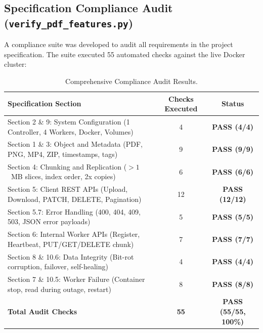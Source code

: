 \documentclass[11pt,a4paper]{article}
\begin{document}
\subsection{Specification Compliance Audit (\texttt{verify\_pdf\_features.py})}
A compliance suite was developed to audit all requirements in the project specification. The suite executed 55 automated checks against the live Docker cluster:
\begin{table}[H]
\centering
\small
\begin{tabular}{@{}lcc@{}}
\toprule
\textbf{Specification Section} & \textbf{Checks Executed} & \textbf{Status} \\ \midrule
Section 2 \& 9: System Configuration (1 Controller, 4 Workers, Docker, Volumes) & 4 & \textbf{PASS (4/4)} \\
Section 1 \& 3: Object and Metadata (PDF, PNG, MP4, ZIP, timestamps, tags)      & 9 & \textbf{PASS (9/9)} \\
Section 4: Chunking and Replication ($>1$~MB slices, index order, 2x copies)    & 6 & \textbf{PASS (6/6)} \\
Section 5: Client REST APIs (Upload, Download, PATCH, DELETE, Pagination)       & 12 & \textbf{PASS (12/12)} \\
Section 5.7: Error Handling (400, 404, 409, 503, JSON error payloads)           & 5 & \textbf{PASS (5/5)} \\
Section 6: Internal Worker APIs (Register, Heartbeat, PUT/GET/DELETE chunk)     & 7 & \textbf{PASS (7/7)} \\
Section 8 \& 10.6: Data Integrity (Bit-rot corruption, failover, self-healing)  & 4 & \textbf{PASS (4/4)} \\
Section 7 \& 10.5: Worker Failure (Container stop, read during outage, restart) & 8 & \textbf{PASS (8/8)} \\ \midrule
\textbf{Total Audit Checks} & \textbf{55} & \textbf{PASS (55/55, 100\%)} \\ \bottomrule
\end{tabular}
\caption{Comprehensive Compliance Audit Results.}
\label{tab:audit}
\end{table}
\end{document}
